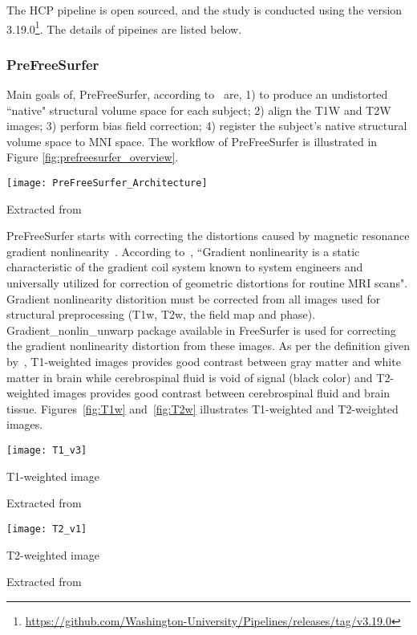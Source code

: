The HCP pipeline is open sourced, and the study is conducted using the version 3.19.0\footnote{\url{https://github.com/Washington-University/Pipelines/releases/tag/v3.19.0}}. The details of pipeines are listed below.

\subsubsection{PreFreeSurfer}
Main goals of, PreFreeSurfer, according to~\cite{Gla13} are, 1) to produce an undistorted ``native" structural volume space for each subject; 2) align the T1W and T2W images; 3) perform bias field correction; 4) register the subject's native structural volume space to MNI space. The workflow of PreFreeSurfer is illustrated in Figure \ref{fig:prefreesurfer_overview}.

\begin{center}
  \texttt{[image: PreFreeSurfer\_Architecture]}
  \label{fig:prefreesurfer_overview}
  \caption*{Extracted from \cite{Gla13}}
\end{center}

PreFreeSurfer starts with correcting the distortions caused by magnetic resonance gradient nonlinearity~\cite{Gla13}. According to~\cite{Zou2004}, ``Gradient nonlinearity is a static characteristic of the gradient coil system known to system engineers and universally utilized for correction of geometric distortions for routine MRI scans". Gradient nonlinearity distorition must be corrected from all images used for structural preprocessing (T1w, T2w, the field map and phase). Gradient\_nonlin\_unwarp package available in FreeSurfer is used for correcting the gradient nonlinearity distortion from these images. As per the definition given by~\cite{t1w_t2w}, T1-weighted images provides good contrast between gray matter and white matter in brain while cerebrospinal fluid is void of signal (black color) and T2-weighted images provides good contrast between cerebrospinal fluid and brain tissue. Figures~\ref{fig:T1w} and~\ref{fig:T2w} illustrates T1-weighted and T2-weighted images.\\

\begin{center}
  \texttt{[image: T1\_v3]}
  \caption{T1-weighted image}
  \label{fig:T1w}
  \caption*{Extracted from \cite{t1w_t2w}}
\end{center}

\begin{center}
  \texttt{[image: T2\_v1]}
  \caption{T2-weighted image}
  \label{fig:T2w}
  \caption*{Extracted from \cite{t1w_t2w}}
\end{center}

